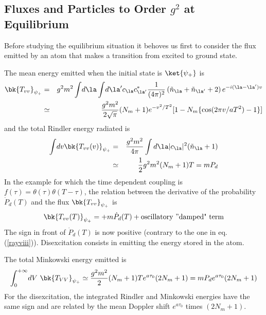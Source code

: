 \documentclass[12pt]{article}
\begin{document}
\subsection{Fluxes and Particles to Order $g^2$ at Equilibrium}

Before studying the equilibrium situation it behoves us first to consider the
flux emitted by an atom that makes a transition from excited to ground state.

The mean energy emitted when the initial state is $\ket{\psi_+}$ is
\begin{eqnarray}
\bk{T_{vv}}_{\psi_+} &=&
 g^2 m^2
\int\!
d\la \int \! d\la^\prime c_\la c_{\la^\prime}^*
{1 \over (4 \pi)^2}
\left (  \tilde n_\la + \tilde n_{\la^\prime}  + 2 \right)
e^{-i(\la-\la^\prime)v}\nonumber\\
&\simeq&{g^2 m^2 \over 2 \sqrt{\pi}}
(N_m + 1) e^{-v^2/T^2}
[ 1 - N_m \{ \cos (2 \pi v/a T^2) -1 \} ]
\label{rayxv}
\end{eqnarray}
and the total Rindler energy radiated is
\begin{eqnarray}
\int\! dv \bk{T_{vv}(v)}_{\psi_+} &=&   {g^2
m^2 \over 4 \pi} \int
d\la
\vert c_\la \vert^2  (\tilde n_\la + 1)
\nonumber\\  &\simeq&
{1 \over 2} g^2 m^2 (N_m+1)T   = m P_{d}
\label{rayxvi}
\end{eqnarray}
In the example for which the time dependent
coupling is $f(\tau) = \theta(\tau) \theta( T- \tau)$,
the relation between the derivative of the probability
$ \dot P_{d}(T)$ and the flux $ \bk{T_{vv}}_{\psi_+}$ is
 \begin{equation}
 \bk{T_{vv}(T)}_{\psi_+} =
+ m \dot P_{d}(T) + \hbox{oscillatory ''damped" term}
\label{rayxvii}
\end{equation}
The sign in front of $ \dot P_d(T)$ is now positive (contrary to the one
in eq. (\ref{rayviii})).
Disexcitation  consists in emitting the energy stored in the atom.

The total
Minkowski
energy emitted
is
\begin{eqnarray}
 \int^{+\infty}_{0}\! dV \ \bk{T_{V V}}_{\psi_+}
\simeq {g^2 m^2 \over 2}(N_m+1)T e^{a \tau_0}(2 N_m + 1) =
m P_{d} e^{a \tau_0}(2 N_m + 1)
\end{eqnarray}
For the disexcitation, the integrated Rindler and Minkowski energies
have the same sign and are related by the mean Doppler shift
$e^{a \tau_0}$ times $(2 N_m + 1)$.
\end{document}
